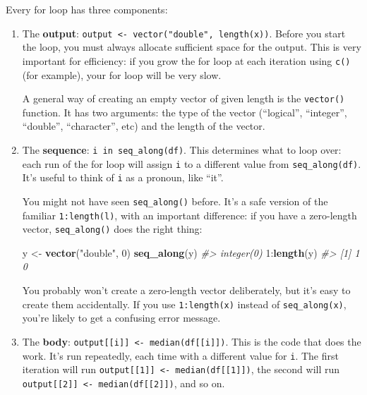 \documentclass[]{book}
\newenvironment{Shaded}{\begin{snugshade}}{\end{snugshade}}
\newcommand{\KeywordTok}[1]{\textcolor[rgb]{0.13,0.29,0.53}{\textbf{{#1}}}}
\newcommand{\DecValTok}[1]{\textcolor[rgb]{0.00,0.00,0.81}{{#1}}}
\newcommand{\StringTok}[1]{\textcolor[rgb]{0.31,0.60,0.02}{{#1}}}
\newcommand{\CommentTok}[1]{\textcolor[rgb]{0.56,0.35,0.01}{\textit{{#1}}}}
\newcommand{\NormalTok}[1]{{#1}}
\begin{document}
Every for loop has three components:

\begin{enumerate}
\def\labelenumi{\arabic{enumi}.}
\item
  The \textbf{output}:
  \texttt{output\ \textless{}-\ vector("double",\ length(x))}. Before
  you start the loop, you must always allocate sufficient space for the
  output. This is very important for efficiency: if you grow the for
  loop at each iteration using \texttt{c()} (for example), your for loop
  will be very slow.

  A general way of creating an empty vector of given length is the
  \texttt{vector()} function. It has two arguments: the type of the
  vector (``logical'', ``integer'', ``double'', ``character'', etc) and
  the length of the vector.
\item
  The \textbf{sequence}: \texttt{i\ in\ seq\_along(df)}. This determines
  what to loop over: each run of the for loop will assign \texttt{i} to
  a different value from \texttt{seq\_along(df)}. It's useful to think
  of \texttt{i} as a pronoun, like ``it''.

  You might not have seen \texttt{seq\_along()} before. It's a safe
  version of the familiar \texttt{1:length(l)}, with an important
  difference: if you have a zero-length vector, \texttt{seq\_along()}
  does the right thing:

\begin{Shaded}
\begin{Highlighting}[]
\NormalTok{y <-}\StringTok{ }\KeywordTok{vector}\NormalTok{(}\StringTok{"double"}\NormalTok{, }\DecValTok{0}\NormalTok{)}
\KeywordTok{seq_along}\NormalTok{(y)}
\CommentTok{#> integer(0)}
\DecValTok{1}\NormalTok{:}\KeywordTok{length}\NormalTok{(y)}
\CommentTok{#> [1] 1 0}
\end{Highlighting}
\end{Shaded}

  You probably won't create a zero-length vector deliberately, but it's
  easy to create them accidentally. If you use \texttt{1:length(x)}
  instead of \texttt{seq\_along(x)}, you're likely to get a confusing
  error message.
\item
  The \textbf{body}:
  \texttt{output{[}{[}i{]}{]}\ \textless{}-\ median(df{[}{[}i{]}{]})}.
  This is the code that does the work. It's run repeatedly, each time
  with a different value for \texttt{i}. The first iteration will run
  \texttt{output{[}{[}1{]}{]}\ \textless{}-\ median(df{[}{[}1{]}{]})},
  the second will run
  \texttt{output{[}{[}2{]}{]}\ \textless{}-\ median(df{[}{[}2{]}{]})},
  and so on.
\end{enumerate}
\end{document}
